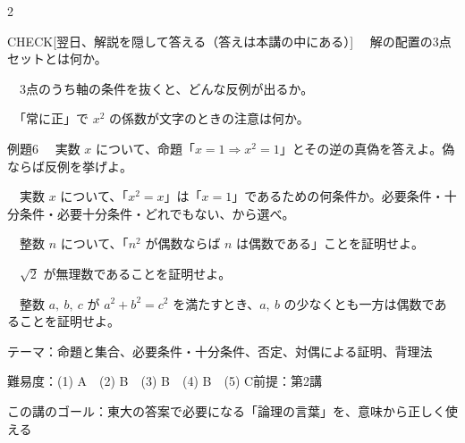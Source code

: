 \documentclass[paper=b5j, fontsize=8pt, fleqn, twoside]{jlreq}
\begin{document}
\begin{multicols*}{2}
  \begin{ptbs}{CHECK}[翌日、解説を隠して答える（答えは本講の中にある）]
    　解の配置の3点セットとは何か。\par
    　3点のうち軸の条件を抜くと、どんな反例が出るか。\par
    　「常に正」で $x^2$ の係数が文字のときの注意は何か。
  \end{ptbs}

  \notefill
\end{multicols*}

\begin{ascolorbox4A}[出典：オリジナル]{例題6}
  　実数 $x$ について、命題「$x=1\Longrightarrow x^2=1$」とその逆の真偽を答えよ。偽ならば反例を挙げよ。\par
  　実数 $x$ について、「$x^2=x$」は「$x=1$」であるための何条件か。必要条件・十分条件・必要十分条件・どれでもない、から選べ。\par
  　整数 $n$ について、「$n^2$ が偶数ならば $n$ は偶数である」ことを証明せよ。\par
  　$\sqrt2$ が無理数であることを証明せよ。\par
  　整数 $a,\ b,\ c$ が $a^2+b^2=c^2$ を満たすとき、$a,\ b$ の少なくとも一方は偶数であることを証明せよ。
\end{ascolorbox4A}

\begin{Data}
  テーマ：命題と集合、必要条件・十分条件、否定、対偶による証明、背理法\par
  難易度：(1) A　(2) B　(3) B　(4) B　(5) C\quad 前提：第2講\par
  この講のゴール：東大の答案で必要になる「論理の言葉」を、意味から正しく使える
\end{Data}
\end{document}
